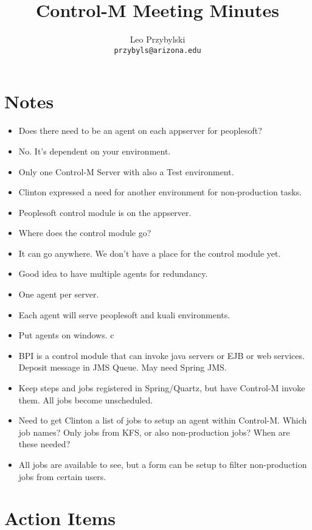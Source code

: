 \documentclass[12pt,notitlepage]{article}
\author{Leo Przybylski \\
\texttt{przybyls@arizona.edu}}
\title{Control-M Meeting Minutes}
\begin{document}
\maketitle
\section{Notes}
\begin{itemize}
\item Does there need to be an agent on each appserver for peoplesoft? 

\item No. It's dependent on your environment.

\item Only one Control-M Server with also a Test environment.

\item Clinton expressed a need for another environment for non-production tasks.

\item Peoplesoft control module is on the appserver.

\item Where does the control module go?

\item It can go anywhere. We don't have a place for the control module yet.

\item Good idea to have multiple agents for redundancy.

\item One agent per server.

\item Each agent will serve peoplesoft and kuali environments.

\item Put agents on windows.
c
\item BPI is a control module that can invoke java servers or EJB or web services. Deposit message in JMS Queue. May need Spring JMS.

\item Keep steps and jobs registered in Spring/Quartz, but have Control-M invoke them. All jobs become unscheduled.

\item Need to get Clinton a list of jobs to setup an agent within Control-M. Which job names? Only jobs from KFS, or also 
  non-production jobs? When are these needed?

\item All jobs are available to see, but a form can be setup to filter non-production jobs from certain users.

\end{itemize}

\section{Action Items}
\end{document}
